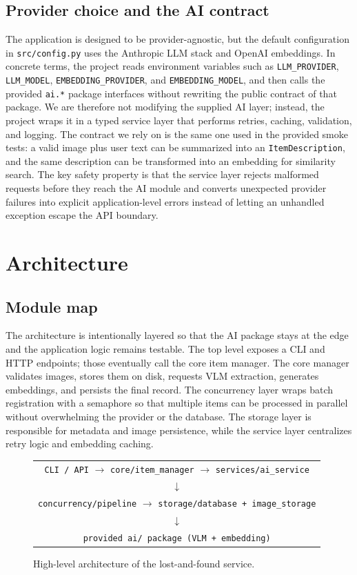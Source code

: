 \documentclass[11pt,a4paper]{article}
\begin{document}
\subsection{Provider choice and the AI contract}
The application is designed to be provider-agnostic, but the default configuration in \texttt{src/config.py} uses the Anthropic LLM stack and OpenAI embeddings. In concrete terms, the project reads environment variables such as \texttt{LLM\_PROVIDER}, \texttt{LLM\_MODEL}, \texttt{EMBEDDING\_PROVIDER}, and \texttt{EMBEDDING\_MODEL}, and then calls the provided \texttt{ai.*} package interfaces without rewriting the public contract of that package. We are therefore not modifying the supplied AI layer; instead, the project wraps it in a typed service layer that performs retries, caching, validation, and logging. The contract we rely on is the same one used in the provided smoke tests: a valid image plus user text can be summarized into an \texttt{ItemDescription}, and the same description can be transformed into an embedding for similarity search. The key safety property is that the service layer rejects malformed requests before they reach the AI module and converts unexpected provider failures into explicit application-level errors instead of letting an unhandled exception escape the API boundary.

\section{Architecture}
\subsection{Module map}
The architecture is intentionally layered so that the AI package stays at the edge and the application logic remains testable. The top level exposes a CLI and HTTP endpoints; those eventually call the core item manager. The core manager validates images, stores them on disk, requests VLM extraction, generates embeddings, and persists the final record. The concurrency layer wraps batch registration with a semaphore so that multiple items can be processed in parallel without overwhelming the provider or the database. The storage layer is responsible for metadata and image persistence, while the service layer centralizes retry logic and embedding caching.

\begin{figure}[H]
\centering
\begin{tabular}{c}
\texttt{CLI / API} $\rightarrow$ \texttt{core/item\_manager} $\rightarrow$ \texttt{services/ai\_service} \\
\hspace{2.2cm} $\downarrow$ \\
\texttt{concurrency/pipeline} $\rightarrow$ \texttt{storage/database + image\_storage} \\
\hspace{2.2cm} $\downarrow$ \\
\texttt{provided ai/ package (VLM + embedding)}
\end{tabular}
\caption{High-level architecture of the lost-and-found service.}
\end{figure}
\end{document}
